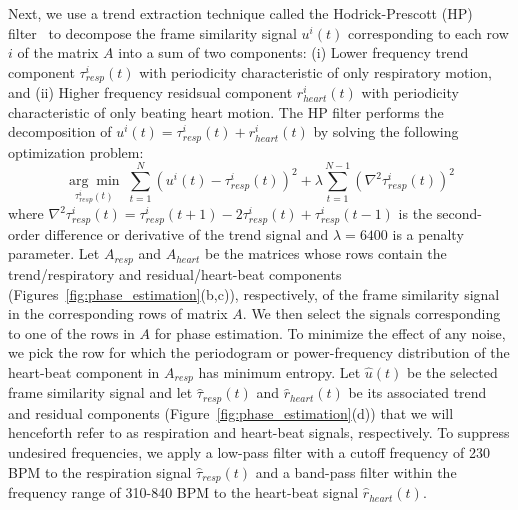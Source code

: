 \documentclass[journal]{IEEEtran}
\newcommand{\argmin}[1]{\underset{#1}{\operatorname{arg}\operatorname{min}}\;}
\begin{document}
	Next, we use a trend extraction technique called the Hodrick-Prescott (HP) filter~\cite{Alexandrov2012} to decompose the frame similarity signal $u^i(t)$ corresponding to each row $i$ of the matrix $A$ into a sum of two components: (i) Lower frequency trend component $\tau^i_{resp}(t)$ with periodicity characteristic of only respiratory motion, and (ii) Higher frequency residsual component $r^i_{heart}(t)$ with periodicity characteristic of only beating heart motion. The HP filter performs the decomposition of $u^i(t) = \tau^i_{resp}(t) + r^i_{heart}(t)$ by solving the following optimization problem:
\begin{equation}	
\argmin{\tau^i_{resp}(t)} \sum_{t=1}^{N}  \left(u^i(t) - \tau^i_{resp}(t) \right)^2  + \lambda \sum_{t=1}^{N-1} \left( \nabla^2 \tau^i_{resp}(t) \right)^2
\end{equation}
where $\nabla^2\tau^i_{resp}(t) = \tau^i_{resp}(t+1) - 2 \tau^i_{resp}(t) + \tau^i_{resp}(t-1)$ is the second-order difference or derivative of the trend signal and $\lambda=6400$ is a penalty parameter. Let $A_{resp}$ and $A_{heart}$ be the matrices whose rows contain the trend/respiratory and residual/heart-beat components (Figures~\ref{fig:phase_estimation}(b,c)), respectively, of the frame similarity signal in the corresponding rows of matrix $A$. We then select the signals corresponding to one of the rows in $A$ for phase estimation. To minimize the effect of any noise, we pick the row for which the periodogram or power-frequency distribution of the heart-beat component in $A_{resp}$ has minimum entropy. Let $\hat{u}(t)$ be the selected frame similarity signal and let $\hat{\tau}_{resp}(t)$ and $\hat{r}_{heart}(t)$  be its associated trend and residual components  (Figure~\ref{fig:phase_estimation}(d)) that we will henceforth refer to as respiration and heart-beat signals, respectively. To suppress undesired frequencies, we apply a low-pass filter with a cutoff frequency of 230 BPM to the respiration signal $\hat{\tau}_{resp}(t)$ and a band-pass filter within the frequency range of 310-840 BPM to the heart-beat signal $\hat{r}_{heart}(t)$.
%
\end{document}
